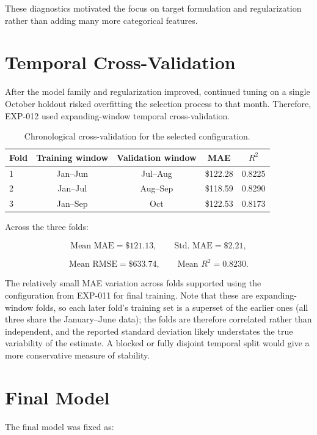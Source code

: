 \documentclass[11pt,a4paper]{article}
\newcommand{\rscore}{R^2}
\begin{document}
These diagnostics motivated the focus on target formulation and regularization rather than adding many more categorical features.

\section{Temporal Cross-Validation}

After the model family and regularization improved, continued tuning on a single October holdout risked overfitting the selection process to that month. Therefore, EXP-012 used expanding-window temporal cross-validation.

\begin{table}[H]
\centering
\small
\begin{tabular}{lcccc}
\toprule
\textbf{Fold} & \textbf{Training window} & \textbf{Validation window} & \textbf{MAE} & \(\rscore\)\\
\midrule
1 & Jan--Jun & Jul--Aug & \$122.28 & 0.8225\\
2 & Jan--Jul & Aug--Sep & \$118.59 & 0.8290\\
3 & Jan--Sep & Oct & \$122.53 & 0.8173\\
\bottomrule
\end{tabular}
\caption{Chronological cross-validation for the selected configuration.}
\end{table}

Across the three folds:

\[
\text{Mean MAE} = \$121.13,
\qquad
\text{Std. MAE} = \$2.21,
\]

\[
\text{Mean RMSE} = \$633.74,
\qquad
\text{Mean }R^2 = 0.8230.
\]

The relatively small MAE variation across folds supported using the configuration from EXP-011 for final training. Note that these are expanding-window folds, so each later fold's training set is a superset of the earlier ones (all three share the January--June data); the folds are therefore correlated rather than independent, and the reported standard deviation likely understates the true variability of the estimate. A blocked or fully disjoint temporal split would give a more conservative measure of stability.

\section{Final Model}

The final model was fixed as:
\end{document}
